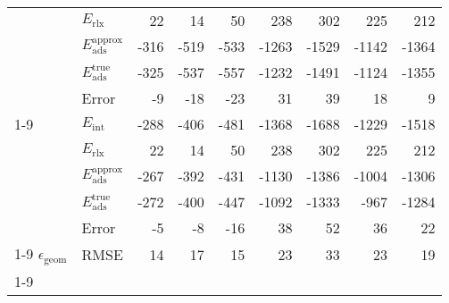 \begin{longtable}{llrrrrrrr}
 & $E_\textrm{rlx}$ & 22 & 14 & 50 & 238 & 302 & 225 & 212 \\
 & $E_\textrm{ads}^\textrm{approx}$ & -316 & -519 & -533 & -1263 & -1529 & -1142 & -1364 \\
 & $E_\textrm{ads}^\textrm{true}$ & -325 & -537 & -557 & -1232 & -1491 & -1124 & -1355 \\
 & Error & -9 & -18 & -23 & 31 & 39 & 18 & 9 \\
\cline{1-9}
\multirow[]{5}{*}{\rotatebox{90}{HSE06-D4}} & $E_\textrm{int}$ & -288 & -406 & -481 & -1368 & -1688 & -1229 & -1518 \\
 & $E_\textrm{rlx}$ & 22 & 14 & 50 & 238 & 302 & 225 & 212 \\
 & $E_\textrm{ads}^\textrm{approx}$ & -267 & -392 & -431 & -1130 & -1386 & -1004 & -1306 \\
 & $E_\textrm{ads}^\textrm{true}$ & -272 & -400 & -447 & -1092 & -1333 & -967 & -1284 \\
 & Error & -5 & -8 & -16 & 38 & 52 & 36 & 22 \\
\cline{1-9}
$\epsilon_\textrm{geom}$ & RMSE & 14 & 17 & 15 & 23 & 33 & 23 & 19 \\
\cline{1-9}
\end{longtable}